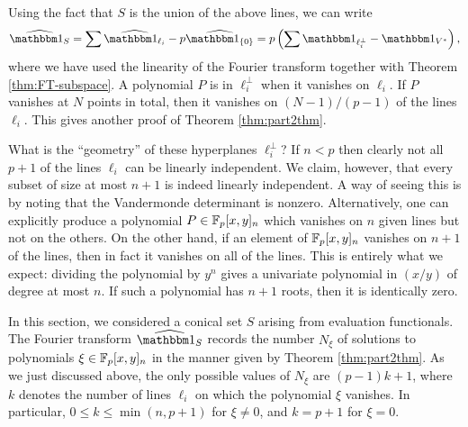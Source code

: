 Using the fact that $S$ is the union of the above lines, we can write
\begin{align*}
	\widehat{\IND_S} = \sum \widehat{\IND_{\ell_i}} - p\widehat{\IND_{\{0\}}} = p\left(\sum \IND_{\ell_i^\bot} - \IND_{V^*}\right),
\end{align*}
where we have used the linearity of the Fourier transform together with Theorem \ref{thm:FT-subspace}. A polynomial $P$ is in $\ell_i^\bot$ when it vanishes on $\ell_i$. If $P$ vanishes at $N$ points in total, then it vanishes on $(N - 1)/(p-1)$ of the lines $\ell_i$. This gives another proof of Theorem \ref{thm:part2thm}.

What is the ``geometry'' of these hyperplanes $\ell_i^\bot$? If $n < p$ then clearly not all $p+1$ of the lines $\ell_i$ can be linearly independent. We claim, however, that every subset of size at most $n+1$ is indeed linearly independent. A way of seeing this is by noting that the Vandermonde determinant is nonzero. Alternatively, one can explicitly produce a polynomial $P \in \mathbb{F}_p[x,y]_n$ which vanishes on $n$ given lines but not on the others. On the other hand, if an element of $\mathbb{F}_p[x,y]_n$ vanishes on $n+1$ of the lines, then in fact it vanishes on all of the lines. This is entirely what we expect: dividing the polynomial by $y^n$ gives a univariate polynomial in $(x/y)$ of degree at most $n$. If such a polynomial has $n+1$ roots, then it is identically zero.

In this section, we considered a conical set $S$ arising from evaluation functionals. The Fourier transform $\widehat{\IND_S}$ records the number $N_\xi$ of solutions to polynomials $\xi\in\mathbb{F}_p[x,y]_n$ in the manner given by Theorem \ref{thm:part2thm}. As we just discussed above, the only possible values of $N_\xi$ are $(p-1)k + 1$, where $k$ denotes the number of lines $\ell_i$ on which the polynomial $\xi$ vanishes. In particular, $0 \leq k \leq \min(n,p+1)$ for $\xi\neq 0$, and $k=p+1$ for $\xi = 0$.
